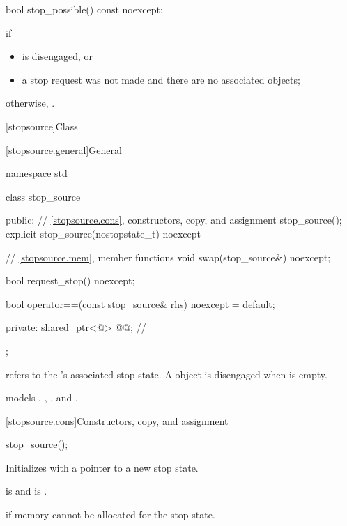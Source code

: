 %
\begin{itemdecl}
bool stop_possible() const noexcept;
\end{itemdecl}

\begin{itemdescr}
\pnum
\returns
{} if
\begin{itemize}
\item {} is disengaged, or
\item a stop request was not made
      and there are no associated  objects;
\end{itemize}
otherwise, .
\end{itemdescr}

[stopsource]{Class }%
%

[stopsource.general]{General}

\begin{codeblock}
namespace std {
  class stop_source {
  public:
    // \ref{stopsource.cons}, constructors, copy, and assignment
    stop_source();
    explicit stop_source(nostopstate_t) noexcept {}

    // \ref{stopsource.mem}, member functions
    void swap(stop_source&) noexcept;

    bool request_stop() noexcept;

    bool operator==(const stop_source& rhs) noexcept = default;

  private:
    shared_ptr<@\unspec@> @@;                         // \expos
  };
}
\end{codeblock}

\pnum
{} refers to the 's associated stop state.
A  object is disengaged when  is empty.

\pnum
{} models
,
,
, and
.

[stopsource.cons]{Constructors, copy, and assignment}

%
\begin{itemdecl}
stop_source();
\end{itemdecl}

\begin{itemdescr}
\pnum
\effects
Initializes  with a pointer to a new stop state.

\pnum
\ensures
{} is 
and  is .

\pnum
\throws
{} if memory cannot be allocated for the stop state.
\end{itemdescr}

